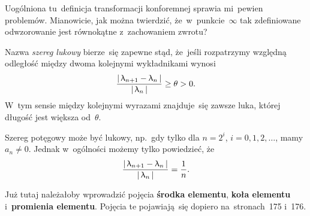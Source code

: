 \documentclass[a4paper,11pt]{article}
\begin{document}
\vspace{\spaceFour}



\start {} Uogólniona tu~definicja transformacji konforemnej
sprawia mi~pewien problemów. Mianowicie, jak można twierdzić,
że~w~punkcie~$\infty$ tak zdefiniowane odwzorowanie jest równokątne
z~zachowaniem zwrotu?

\vspace{\spaceFour}



\start {} Nazwa \textit{szereg lukowy} bierze~się zapewne stąd,
że~jeśli rozpatrzymy względną odległość między dwoma kolejnymi
wykładnikami wynosi
\begin{equation}
  \label{eq:Leja-49}
  \frac{ |\, {  \uplambda_{ n + 1 } - \uplambda_{ n }  } \,| }{ |\, {  \uplambda_{ n }  } \,| }
  \geq \theta > 0.
\end{equation}
W~tym sensie między kolejnymi wyrazami znajduje~się zawsze luka,
której długość jest większa od~$\theta$.

Szereg potęgowy może być lukowy, np.~gdy tylko dla $n = 2^{ i }$,
$i = 0, 1, 2, \ldots$, mamy $a_{ n } \neq 0$. Jednak w~ogólności
możemy tylko powiedzieć, że
\begin{equation}
  \label{eq:Leja-50}
  \frac{ |\, {  \uplambda_{ n + 1 } - \uplambda_{ n }  } \,| }{ |\, {  \uplambda_{ n }  } \,| }
  = \frac{ 1 }{ n }.
\end{equation}

\vspace{\spaceFour}



\start {} Już tutaj należałoby wprowadzić pojęcia
\textbf{środka elementu}, \textbf{koła elementu} i~\textbf{promienia
  elementu}. Pojęcia te pojawiają~się dopiero na~stronach~175 i~176.

\vspace{\spaceFour}
\end{document}
